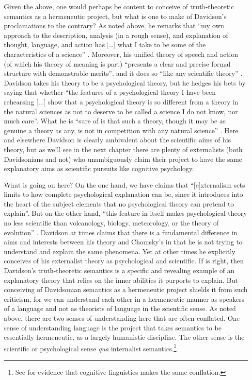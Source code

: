 Given the above, one would perhaps be content to conceive of truth-theoretic semantics as a hermeneutic project, but what is one to make of Davidson’s proclamations to the contrary? As noted above, he remarks that “my own approach to the description, analysis (in a rough sense), and explanation of thought, language, and action has […] what I take to be some of the characteristics of a science” \citep[123]{Davidson1995}. Moreover, his unified theory of speech and action (of which his theory of meaning is part) “presents a clear and precise formal structure with demonstrable merits”, and it does so “like any scientific theory” \citep[126]{Davidson1995}. Davidson takes his theory to be a psychological theory, but he hedges his bets by saying that whether “the features of a psychological theory I have been rehearsing [...] show that a psychological theory is so different from a theory in the natural sciences as not to deserve to be called a science I do not know, nor much care”. What he is “sure of is that such a theory, though it may be as genuine a theory as any, is not in competition with any natural science” \citep[134]{Davidson1995}. Here and elsewhere Davidson is clearly ambivalent about the scientific aims of his theory, but as we’ll see in the next chapter there are plenty of externalists (both Davidsonians and not) who unambiguously claim their project to have the same explanatory aims as scientific pursuits like cognitive psychology. 

What is going on here? On the one hand, we have claims that “[e]xternalism sets limits to how complete psychological explanation can be, since it introduces into the heart of the subject elements that no psychological theory can pretend to explain”. But on the other hand, “this feature in itself makes psychological theory no less scientific than volcanology, biology, meteorology, or the theory of evolution” \citep[129--130]{Davidson1995}. Davidson at times claims that there is a fundamental difference in aims and interests between his theory and Chomsky’s in that he is not trying to understand and explain the same phenomena. Yet at other times he explicitly conceives of his externalist theory as psychological and scientific. If \citet{Slezak2018} is right, then Davidson’s truth-theoretic semantics is a specific and revealing example of an explanatory theory that relies on the inner abilities it purports to explain. But conceiving of Davidsonian semantics as a hermeneutic project shields it from such criticism, for we can understand each other in a hermeneutic manner as speakers of a language and not as theorists of language in the scientific sense. As noted above, there are two senses of understanding here that are often conflated. One sense of understanding language is the project that takes semantics to be essentially hermeneutic, as a largely humanistic discipline. The other sense is the scientific or psychological sense \textit{qua} internalist semantics.\footnote{See \cite{Riemer2019} for evidence that cognitive linguistics makes the same conflation.}

